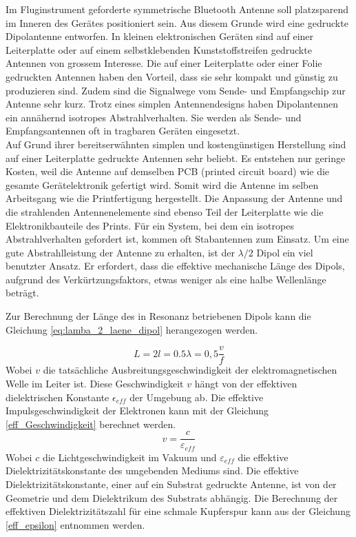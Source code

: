 Im Fluginstrument geforderte symmetrische Bluetooth Antenne soll platzsparend im Inneren des Gerätes positioniert sein. Aus diesem Grunde wird eine gedruckte Dipolantenne entworfen. In kleinen elektronischen Geräten sind auf einer Leiterplatte oder auf einem selbstklebenden Kunststoffstreifen gedruckte Antennen von grossem Interesse. Die auf einer Leiterplatte oder einer Folie gedruckten Antennen haben den Vorteil, dass sie sehr kompakt und günstig zu produzieren sind. Zudem sind die Signalwege vom Sende- und Empfangschip zur Antenne sehr kurz. Trotz eines simplen Antennendesigns haben Dipolantennen ein annähernd isotropes Abstrahlverhalten. Sie werden als Sende- und Empfangsantennen oft in  tragbaren Geräten eingesetzt. \\

Auf Grund ihrer bereitserwähnten simplen und kostengünstigen Herstellung sind auf einer Leiterplatte gedruckte Antennen sehr beliebt. Es entstehen nur geringe Kosten, weil die Antenne auf demselben PCB (printed circuit board) wie die gesamte Gerätelektronik gefertigt wird. Somit wird die Antenne im selben Arbeitsgang wie die Printfertigung hergestellt. Die  Anpassung der Antenne und die strahlenden Antennenelemente sind ebenso Teil der Leiterplatte wie die Elektronikbauteile des Prints. Für ein System, bei dem ein isotropes Abstrahlverhalten gefordert ist, kommen oft Stabantennen zum Einsatz. Um eine gute Abstrahlleistung der Antenne zu erhalten, ist der $\lambda /2$ Dipol ein viel benutzter Ansatz. Er erfordert, dass die effektive mechanische Länge des Dipols, aufgrund des Verkürtzungsfaktors, etwas weniger als eine halbe Wellenlänge beträgt. 
 
Zur Berechnung der Länge des in Resonanz betriebenen Dipols kann die  Gleichung \ref{eq:lamba_2_laene_dipol} herangezogen werden.

\begin{equation}\label{eq:lamba_2_laene_dipol}
L=2l = 0.5 \lambda= 0,5 \dfrac{v}{f}
\end{equation} 
Wobei $v$ die tatsächliche Ausbreitungsgeschwindigkeit der elektromagnetischen Welle im Leiter ist. Diese Geschwindigkeit $v$ hängt von der effektiven dielektrischen Konstante $\epsilon_{eff}$ der Umgebung  ab. 
Die effektive  Impulsgeschwindigkeit der Elektronen kann mit der Gleichung \ref{eff_Geschwindigkeit} berechnet werden. 
\begin{equation}\label{eff_Geschwindigkeit}
v = \dfrac{c}{\varepsilon_{eff}}
\end{equation}
Wobei $c$ die Lichtgeschwindigkeit im Vakuum und $\varepsilon_{eff}$  die effektive Dielektrizitätskonstante des umgebenden Mediums sind. Die effektive Dielektrizitätskonstante, einer auf ein Substrat gedruckte Antenne, ist von der  Geometrie und dem Dielektrikum des Substrats abhängig. Die Berechnung der effektiven Dielektrizitätszahl für eine schmale Kupferspur kann aus der Gleichung \ref{eff_epsilon} entnommen werden. 

